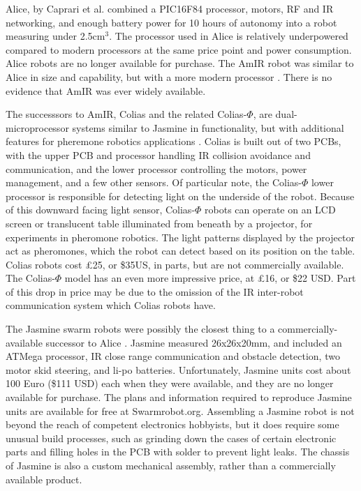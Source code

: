 \documentclass[]{article}
\begin{document}
Alice, by Caprari et al. \cite{caprari1998autonomous} combined a PIC16F84 processor, motors, RF and IR networking, and enough battery power for 10 hours of autonomy into a robot measuring under 2.5cm$^3$. 
The processor used in Alice is relatively underpowered compared to modern processors at the same price point and power consumption. 
Alice robots are no longer available for purchase. 
The AmIR robot was similar to Alice in size and capability, but with a more modern processor \cite{arvin2009development}.
There is no evidence that AmIR was ever widely available.

The successsors to AmIR, Colias and the related Colias-$\Phi$, are dual-microprocessor systems similar to Jasmine in functionality, but with additional features for pheremone robotics applications \cite{arvin2014colias, arvin2015colias}. 
Colias is built out of two PCBs, with the upper PCB and processor handling IR collision avoidance and communication, and the lower processor controlling the motors, power management, and a few other sensors.
Of particular note, the Colias-$\Phi$ lower processor is responsible for detecting light on the underside of the robot. 
Because of this downward facing light sensor, Colias-$\Phi$ robots can operate on an LCD screen or translucent table illuminated from beneath by a projector, for experiments in pheromone robotics. 
The light patterns displayed by the projector act as pheromones, which the robot can detect based on its position on the table. 
Colias robots cost \pounds25, or \$35US, in parts, but are not commercially available. 
The Colias-$\Phi$ model has an even more impressive price, at \pounds16, or \$22 USD.
Part of this drop in price may be due to the omission of the IR inter-robot communication system which Colias robots have. 

The Jasmine swarm robots were possibly the closest thing to a commercially-available successor to Alice  \cite{kernbach2011swarmrobot}.
Jasmine measured 26x26x20mm, and included an ATMega processor, IR close range communication and obstacle detection, two motor skid steering, and li-po batteries.
Unfortunately, Jasmine units cost about 100 Euro (\$111 USD) each when they were available, and they are no longer available for purchase. 
The plans and information required to reproduce Jasmine units are available for free at Swarmrobot.org.
Assembling a Jasmine robot is not beyond the reach of competent electronics hobbyists, but it does require some unusual build processes, such as grinding down the cases of certain electronic parts and filling holes in the PCB with solder to prevent light leaks. 
The chassis of Jasmine is also a custom mechanical assembly, rather than a commercially available product. 
\end{document}
